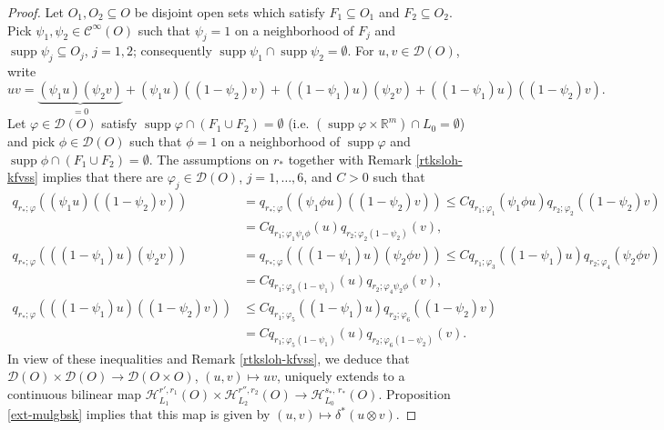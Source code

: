 \documentclass{amsart}
\newcommand{\supp}{\operatorname{supp}}
\theoremstyle{definition}
\begin{document}
\begin{proof}
Let $O_1,O_2\subseteq O$ be disjoint open sets which satisfy $F_1\subseteq O_1$ and $F_2\subseteq O_2$. Pick $\psi_1,\psi_2\in\mathcal{C}^{\infty}(O)$ such that $\psi_j=1$ on a neighborhood of $F_j$ and $\supp\psi_j\subseteq O_j$, $j=1,2$; consequently $\supp\psi_1\cap\supp\psi_2=\emptyset$. For $u,v\in \mathcal{D}(O)$, write
\begin{equation*}
uv= \underbrace{(\psi_1 u )(\psi_2 v )}_{=0}
	+ 
	(\psi_1 u )	((1 - \psi_2) v)
	+ 
	((1 - \psi_1) u)(\psi_2 v)+ ((1 - \psi_1) u)((1 - \psi_2) v).
\end{equation*}
Let $\varphi\in\mathcal{D}(O)$ satisfy $\supp\varphi\cap(F_1\cup F_2)=\emptyset$ (i.e. $(\supp\varphi\times \mathbb{R}^m)\cap L_0=\emptyset$) and pick $\phi\in\mathcal{D}(O)$ such that $\phi=1$ on a neighborhood of $\supp\varphi$ and $\supp\phi\cap(F_1\cup F_2)=\emptyset$. The assumptions on $r_*$ together with Remark \ref{rtksloh-kfvss} implies that there are $\varphi_j\in\mathcal{D}(O)$, $j=1,\ldots,6$, and $C>0$ such that
\begin{align*}
q_{r_*;\varphi}((\psi_1 u )	((1 - \psi_2) v))&=q_{r_*;\varphi}((\psi_1\phi u )	((1 - \psi_2) v))\leq Cq_{r_1;\varphi_1}(\psi_1\phi u ) q_{r_2;\varphi_2}((1 - \psi_2) v)\\
&=Cq_{r_1;\varphi_1\psi_1\phi}(u) q_{r_2;\varphi_2(1 - \psi_2)}(v),\\
q_{r_*;\varphi}(((1-\psi_1) u )(\psi_2 v))&=q_{r_*;\varphi}(((1-\psi_1) u )(\psi_2\phi v))\leq Cq_{r_1;\varphi_3}((1-\psi_1) u ) q_{r_2;\varphi_4}(\psi_2\phi v)\\
&=Cq_{r_1;\varphi_3(1-\psi_1)}(u) q_{r_2;\varphi_4\psi_2\phi }(v),\\
q_{r_*;\varphi}(((1 - \psi_1) u)((1 - \psi_2) v))&\leq Cq_{r_1;\varphi_5}((1 - \psi_1) u)q_{r_2;\varphi_6}((1 - \psi_2) v)\\
&= Cq_{r_1;\varphi_5(1 - \psi_1)}(u)q_{r_2;\varphi_6(1 - \psi_2)}(v).
\end{align*}
In view of these inequalities and Remark \ref{rtksloh-kfvss}, we deduce that $\mathcal{D}(O)\times \mathcal{D}(O)\rightarrow \mathcal{D}(O\times O)$, $(u,v)\mapsto uv$, uniquely extends to a continuous bilinear map $\mathscr{H}_{L_1} ^{r',r_1} (O)\times\mathscr{H}_{L_2} ^{r'',r_2} (O)\rightarrow \mathscr{H}_{L_0} ^{s_*, \, r_*} (O)$. Proposition \ref{ext-mulgbsk} implies that this map is given by $(u,v)\mapsto \delta^*(u\otimes v)$.
\end{proof}
\end{document}
